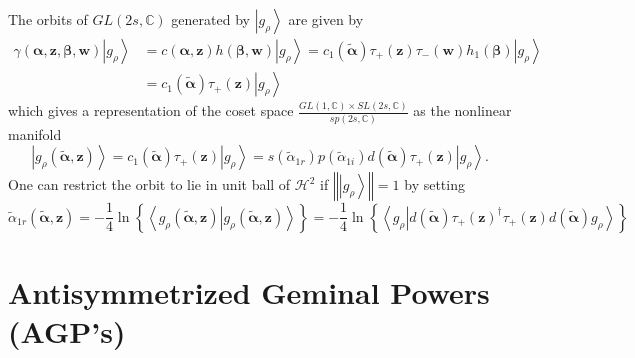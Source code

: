 \documentclass[aps,preprint]{revtex4}%
\begin{document}
The orbits of $GL\left(  2s,\mathbb{C}\right)  $ generated by $\left\vert
g_{\rho}\right\rangle $ are given by
\begin{align}
\gamma\left(  \mathbf{\alpha,z,\beta},\mathbf{w}\right)  \left\vert g_{\rho
}\right\rangle  &  =c\left(  \mathbf{\alpha,z}\right)  h\left(  \mathbf{\beta
},\mathbf{w}\right)  \left\vert g_{\rho}\right\rangle =c_{1}\left(
\mathbf{\tilde{\alpha}}\right)  \tau_{+}\left(  \mathbf{z}\right)  \tau
_{-}\left(  \mathbf{w}\right)  h_{1}\left(  \mathbf{\beta}\right)  \left\vert
g_{\rho}\right\rangle \nonumber\\
&  =c_{1}\left(  \mathbf{\tilde{\alpha}}\right)  \tau_{+}\left(
\mathbf{z}\right)  \left\vert g_{\rho}\right\rangle
\end{align}
which gives a representation of the coset space $\frac{GL\left(
1,\mathbb{C}\right)  \times SL\left(  2s,\mathbb{C}\right)  }{sp\left(
2s,\mathbb{C}\right)  }$ as the nonlinear manifold
\begin{equation}
\left\vert g_{\rho}\left(  \mathbf{\tilde{\alpha},z}\right)  \right\rangle
=c_{1}\left(  \mathbf{\tilde{\alpha}}\right)  \tau_{+}\left(  \mathbf{z}%
\right)  \left\vert g_{\rho}\right\rangle =\mathit{s}\left(  \tilde{\alpha
}_{1r}\right)  \mathit{p}\left(  \tilde{\alpha}_{1i}\right)  d\left(
\mathbf{\tilde{\alpha}}\right)  \tau_{+}\left(  \mathbf{z}\right)  \left\vert
g_{\rho}\right\rangle .
\end{equation}
One can restrict the orbit to lie in unit ball of $\mathcal{H}^{2}$ if
$\left\Vert \left\vert g_{\rho}\right\rangle \right\Vert =1$ by setting
\begin{equation}
\tilde{\alpha}_{1r}\left(  \mathbf{\tilde{\alpha},z}\right)  =-\frac{1}{4}%
\ln\left\{  \left\langle g_{\rho}\left(  \mathbf{\tilde{\alpha},z}\right)
\left\vert g_{\rho}\left(  \mathbf{\tilde{\alpha},z}\right)  \right.
\right\rangle \right\}  =-\frac{1}{4}\ln\left\{  \left\langle g_{\rho
}\left\vert d\left(  \mathbf{\tilde{\alpha}}\right)  \tau_{+}\left(
\mathbf{z}\right)  ^{\dagger}\tau_{+}\left(  \mathbf{z}\right)  d\left(
\mathbf{\tilde{\alpha}}\right)  g_{\rho}\right.  \right\rangle \right\}
\end{equation}


\section{Antisymmetrized Geminal Powers (AGP's)}
\end{document}
